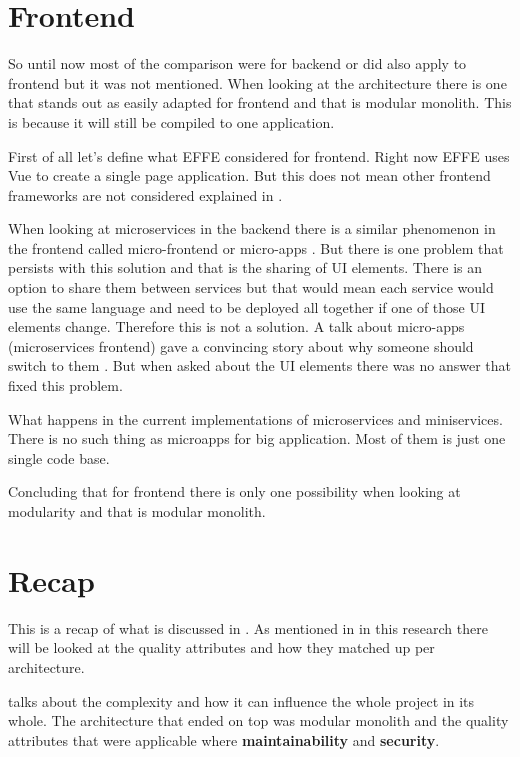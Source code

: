 \section{Frontend}
\label{sec:FrontendComparison}

So until now most of the comparison were for backend or did also apply to frontend but it was not mentioned. When looking at the architecture there is one that stands out as easily adapted for frontend and that is modular monolith. This is because it will still be compiled to one application.

First of all let’s define what EFFE considered for frontend. Right now EFFE uses Vue to create a single page application. But this does not mean other frontend frameworks are not considered explained in .

When looking at microservices in the backend there is a similar phenomenon in the frontend called micro-frontend or micro-apps \cite{microFrontends}. But there is one problem that persists with this solution and that is the sharing of UI elements. There is an option to share them between services but that would mean each service would use the same language and need to be deployed all together if one of those UI elements change. Therefore this is not a solution. A talk about micro-apps (microservices frontend) gave a convincing story about why someone should switch to them \cite{frontendMicroservices}. But when asked about the UI elements there was no answer that fixed this problem.

What happens in the current implementations of microservices and miniservices. There is no such thing as microapps for big application. Most of them is just one single code base.

Concluding that for frontend there is only one possibility when looking at modularity and that is modular monolith.

\section{Recap}

This is a recap of what is discussed in . As mentioned in  in this research there will be looked at the quality attributes and how they matched up per architecture.

 talks about the complexity and how it can influence the whole project in its whole. The architecture that ended on top was modular monolith and the quality attributes that were applicable where \textbf{maintainability} and \textbf{security}.


